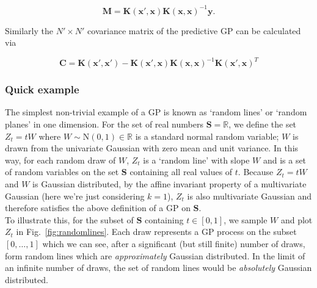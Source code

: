 \begin{equation}
\mathbf{M} = \mathbf{K}(\mathbf{x'}, \mathbf{x}) \mathbf{K}(\mathbf{x},\mathbf{x})^{-1} \mathbf{y}.
\label{eq:predmean}
\end{equation}

\noindent Similarly the $N' \times N'$ covariance matrix of the predictive GP can be calculated via

\begin{equation}
\mathbf{C} = \mathbf{K}(\mathbf{x'}, \mathbf{x'}) - \mathbf{K}(\mathbf{x'}, \mathbf{x})
\mathbf{K}(\mathbf{x}, \mathbf{x})^{-1} \mathbf{K}(\mathbf{x'}, \mathbf{x})^T
\label{eq:predsig}
\end{equation}


\subsubsection{Quick example}
The simplest non-trivial example of a GP is known as `random lines' or `random 
planes' in one dimension. For the set of real numbers $\mathbf{S}=\mathbb{R}$, 
we define the set 
$Z_t =tW$ where $W \sim \mathrm{N}(0,1) \in \mathbb{R}$ is a standard normal 
random variable; $W$ is drawn from the univariate Gaussian with zero mean and unit variance. 
In this way, for each random draw of $W$, $Z_t$ is a `random line' with slope $W$ and 
is a set of random variables on the set $\mathbf{S}$ containing all real values of $t$. 
Because $Z_t=tW$ and $W$ is Gaussian distributed, 
by the affine invariant property of a multivariate Gaussian (here we're just considering 
$k=1$), $Z_t$ is also multivariate Gaussian and therefore satisfies the above definition 
of a GP on $\mathbf{S}$. \\

To illustrate this, 
for the subset of $\mathbf{S}$ containing $t \in [0,1]$, we sample $W$ and plot 
$Z_t$ in Fig.~\ref{fig:randomlines}. Each draw represents a GP process on the 
subset $[0,\dots,1]$ which we can see, after a significant (but still finite) number of 
draws, form random lines which are \emph{approximately} 
Gaussian distributed. In the limit of 
an infinite number of draws, the set of random lines would be \emph{absolutely} Gaussian 
distributed. \\

